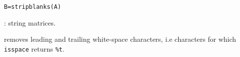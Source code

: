 
\begin{mandesc}
\end{mandesc}
\begin{calling_sequence}
\begin{verbatim}
B=stripblanks(A)
\end{verbatim}
\end{calling_sequence}

\begin{parameters}
  \begin{varlist}
     : string matrices.
  \end{varlist}
\end{parameters}

\begin{mandescription}
removes leading and trailing white-space characters, i.e characters for which 
\verb+isspace+ returns \verb+%t+.
\end{mandescription}

